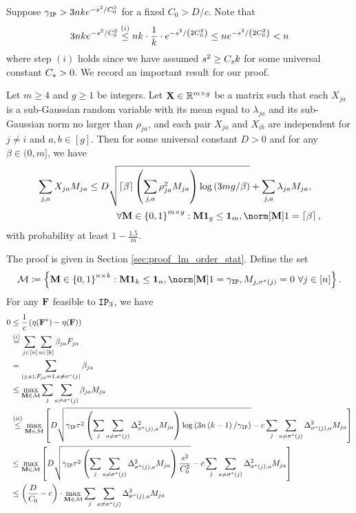 Suppose $\gamma_{\textup{\texttt{IP}}}>3nk e^{-s^{2}/C_{0}^{2}}$ for a fixed
$C_{0}>D/c$. Note that 
\[
3nk e^{-s^{2}/C_{0}^{2}}\overset{(i)}{\le}nk\cdot\frac{1}{k}\cdot e^{-s^{2}/\left(2C_{0}^{2}\right)}\le n e^{-s^{2}/\left(2C_{0}^{2}\right)}<n
\]
where step $(i)$ holds since we have assumed $s^{2}\ge C_{s}k$
for some universal constant $C_{s}>0$. We record an important result
for our proof.
\begin{lem}
\label{lm:order_stats} Let $m\ge4$ and $g\ge1$ be integers. Let
$\mathbf{X}\in\mathbb{R}^{m\times g}$ be a matrix such that each $X_{ja}$ is
a sub-Gaussian random variable with its mean equal to $\lambda_{ja}$
and its sub-Gaussian norm no larger than $\rho_{ja}$, and each pair
$X_{ja}$ and $X_{ib}$ are independent for $j\ne i$ and $a,b\in\left[g\right]$.
Then for some universal constant $D>0$ and for any $\beta\in(0,m]$,
we have 
\begin{align*}
\sum_{j,a}X_{ja}M_{ja} & \le D\sqrt{\left\lceil \beta\right\rceil \left(\sum_{j,a}\rho_{ja}^{2}M_{ja}\right)\log\left(3mg/\beta\right)}+\sum_{j,a}\lambda_{ja}M_{ja},\\
 & \qquad\quad\forall\M\in\left\{ 0,1\right\} ^{m\times g}:\M\one_{g}\le\one_{m},\norm[\M]1=\left\lceil \beta\right\rceil ,
\end{align*}
with probability at least $1-\frac{1.5}{m}$.
\end{lem}
The proof is given in Section \ref{sec:proof_lm_order_stat}. Define
the set 
\[
\calM\coloneqq\left\{ \M\in\left\{ 0,1\right\} ^{\num\times\numclust}:\M\one_{\numclust}\le\one_{\num},\norm[\M]1=\iperror,M_{j,\labelstar(j)}=0\ \forall j\in\left[\num\right]\right\} .
\]
For any $\mathbf{F}$ feasible to $\textup{\texttt{IP}}_{3}$, we have 
\begin{align*}
0 & \le\frac{1}{c}\left(\eta(\mathbf{F}^{*})-\eta(\mathbf{F})\right)\\
 & \overset{(i)}{=}\sum_{j\in[n]}\sum_{a\in[k]}\beta_{ja}F_{ja}\\
 & =\sum_{\left(j,a\right):F_{ja}=1,a\ne\sigma^{*}(j)}\beta_{ja}\\
 & \le\max_{\mathbf{M}\in\mathcal{M}}\sum_{j}\sum_{a\ne\sigma^{*}(j)}\beta_{ja}M_{ja}\\
 & \overset{(ii)}{\le}\max_{\mathbf{M}\in\mathcal{M}}\left[D\sqrt{\gamma_{\textup{\texttt{IP}}}\tau^{2}\left(\sum_{j}\sum_{a\ne\sigma^{*}(j)}\Delta_{\sigma^{*}(j),a}^{2}M_{ja}\right)\log\left(3n\left(k-1\right)/\gamma_{\textup{\texttt{IP}}}\right)}-c\sum_{j}\sum_{a\ne\sigma^{*}(j)}\Delta_{\sigma^{*}(j),a}^{2}M_{ja}\right]\\
 & \le\max_{\mathbf{M}\in\mathcal{M}}\left[D\sqrt{\gamma_{\textup{\texttt{IP}}}\tau^{2}\left(\sum_{j}\sum_{a\ne\sigma^{*}(j)}\Delta_{\sigma^{*}(j),a}^{2}M_{ja}\right)\frac{s^{2}}{C_{0}^{2}}}-c\sum_{j}\sum_{a\ne\sigma^{*}(j)}\Delta_{\sigma^{*}(j),a}^{2}M_{ja}\right]\\
 & \le\left(\frac{D}{C_{0}}-c\right)\cdot\max_{\mathbf{M}\in\mathcal{M}}\sum_{j}\sum_{a\ne\sigma^{*}(j)}\Delta_{\sigma^{*}(j),a}^{2}M_{ja}
\end{align*}
